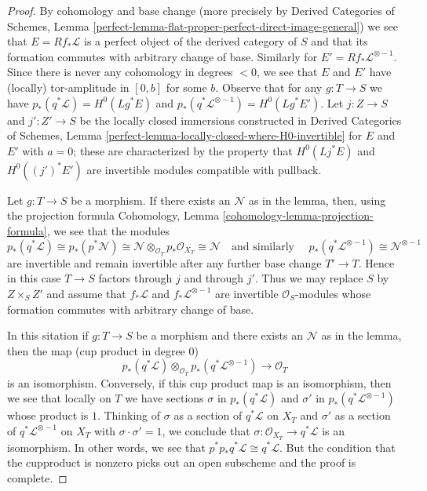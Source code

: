 \begin{proof}
By cohomology and base change (more precisely by
Derived Categories of Schemes, Lemma
\ref{perfect-lemma-flat-proper-perfect-direct-image-general})
we see that $E = Rf_*\mathcal{L}$ is a perfect object of the
derived category of $S$ and that its formation commutes with
arbitrary change of base. Similarly for $E' = Rf_*\mathcal{L}^{\otimes -1}$.
Since there is never any cohomology in degrees $< 0$, we see that
$E$ and $E'$ have (locally) tor-amplitude in $[0, b]$ for some $b$.
Observe that for any $g : T \to S$ we have
$p_*(q^*\mathcal{L}) = H^0(Lg^*E)$ and
$p_*(q^*\mathcal{L}^{\otimes -1}) = H^0(Lg^*E')$.
Let $j : Z \to S$ and $j' : Z' \to S$ be the locally closed
immersions constructed in Derived Categories of Schemes, Lemma
\ref{perfect-lemma-locally-closed-where-H0-invertible}
for $E$ and $E'$ with $a = 0$; these are characterized
by the property that $H^0(Lj^*E)$ and $H^0((j')^*E')$
are invertible modules compatible with pullback.

\medskip\noindent
Let $g : T \to S$ be a morphism. If there exists an $\mathcal{N}$
as in the lemma, then, using the projection formula
Cohomology, Lemma \ref{cohomology-lemma-projection-formula},
we see that the modules
$$
p_*(q^*\mathcal{L}) \cong
p_*(p^*\mathcal{N}) \cong
\mathcal{N} \otimes_{\mathcal{O}_T} p_*\mathcal{O}_{X_T} \cong
\mathcal{N}\quad\text{and similarly }\quad
p_*(q^*\mathcal{L}^{\otimes -1}) \cong \mathcal{N}^{\otimes -1}
$$
are invertible and remain invertible after any further base change $T' \to T$.
Hence in this case $T \to S$ factors through $j$ and through $j'$.
Thus we may replace $S$ by $Z \times_S Z'$ and assume that
$f_*\mathcal{L}$ and $f_*\mathcal{L}^{\otimes -1}$ are invertible
$\mathcal{O}_S$-modules whose formation commutes with arbitrary change of base.

\medskip\noindent
In this sitation if $g : T \to S$ be a morphism and there exists an
$\mathcal{N}$ as in the lemma, then the map (cup product in degree $0$)
$$
p_*(q^*\mathcal{L})
\otimes_{\mathcal{O}_T}
p_*(q^*\mathcal{L}^{\otimes -1})
\longrightarrow \mathcal{O}_T
$$
is an isomorphism. Conversely, if this cup product map is an isomorphism,
then we see that locally on $T$ we have sections
$\sigma$ in $p_*(q^*\mathcal{L})$ and $\sigma'$ in
$p_*(q^*\mathcal{L}^{\otimes -1})$ whose product is $1$.
Thinking of $\sigma$ as a section of $q^*\mathcal{L}$ on $X_T$
and $\sigma'$ as a section of $q^*\mathcal{L}^{\otimes -1}$ on $X_T$
with $\sigma \cdot \sigma' = 1$, we conclude that
$\sigma : \mathcal{O}_{X_T} \to q^*\mathcal{L}$ is an isomorphism.
In other words, we see that $p^*p_*q^*\mathcal{L} \cong q^*\mathcal{L}$.
But the condition that the cupproduct is nonzero picks
out an open subscheme and the proof is complete.
\end{proof}

